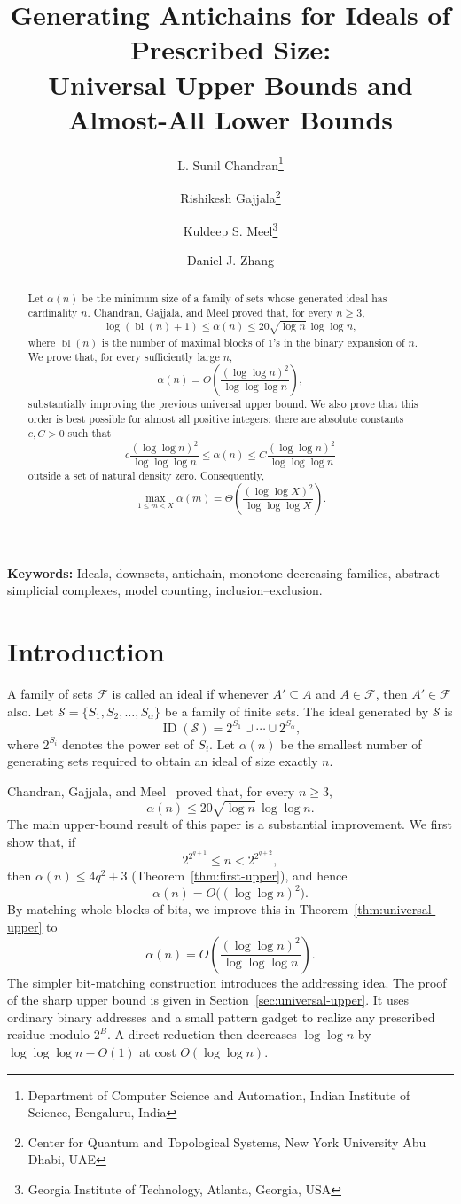 \documentclass[11pt]{article}
\title {Generating Antichains for Ideals of Prescribed Size:\\Universal Upper Bounds and Almost-All Lower Bounds}
\author{L. Sunil Chandran\thanks{Department of Computer Science and Automation, Indian Institute of Science, Bengaluru, India}
\and Rishikesh Gajjala\thanks{Center for Quantum and Topological Systems, New York University Abu Dhabi, UAE}
\and Kuldeep S. Meel\thanks{Georgia Institute of Technology, Atlanta, Georgia, USA}
\and Daniel J. Zhang\footnotemark[3]}
\date{}
\theoremstyle{definition}
\theoremstyle{remark}
\newcommand{\ID}{\operatorname{ID}}
\begin{document}
\maketitle

\begin{abstract}
Let $\alpha(n)$ be the minimum size of a family of sets whose generated ideal
has cardinality $n$.  Chandran, Gajjala, and Meel proved that, for every
$n\ge3$,
\[
  \log(\operatorname{bl}(n)+1)\le\alpha(n)
    \le20\sqrt{\log n}\,\log\log n,
\]
where $\operatorname{bl}(n)$ is the number of maximal blocks of $1$'s in the
binary expansion of $n$.  We prove that, for every sufficiently large $n$,
\[
  \alpha(n)=O\!\left(
    \frac{(\log\log n)^2}{\log\log\log n}
  \right),
\]
substantially improving the previous universal upper bound.  We also prove
that this order is best possible for almost all positive integers: there are
absolute constants $c,C>0$ such that
\[
  c\frac{(\log\log n)^2}{\log\log\log n}
  \le\alpha(n)\le
  C\frac{(\log\log n)^2}{\log\log\log n}
\]
outside a set of natural density zero.  Consequently,
\[
  \max_{1\le m<X}\alpha(m)
  =\Theta\!\left(
    \frac{(\log\log X)^2}{\log\log\log X}
  \right).
\]

\end{abstract}

\noindent\textbf{Keywords:} Ideals, downsets, antichain, monotone decreasing families, abstract simplicial complexes, model counting, inclusion--exclusion.

\section{Introduction}

A family of sets $\mathcal F$ is called an ideal if whenever $A'\subseteq A$ and $A\in\mathcal F$, then $A'\in\mathcal F$ also.
Let $\mathcal S=\{S_1,S_2,\ldots,S_\alpha\}$ be a family of finite sets. The ideal generated by $\mathcal S$ is
\[
  \ID(\mathcal S)=2^{S_1}\cup\cdots\cup2^{S_\alpha},
\]
where $2^{S_i}$ denotes the power set of $S_i$. Let $\alpha(n)$ be the smallest number of generating sets required to obtain an ideal of size exactly $n$.

Chandran, Gajjala, and Meel~\cite{ChandranGajjalaMeel26} proved that, for every $n\ge3$,
\[
    \alpha(n)\le20\sqrt{\log n}\,\log\log n.
\]
The main upper-bound result of this paper is a substantial improvement. We first show that, if
\[
  2^{2^{q+1}}\le n<2^{2^{q+2}},
\]
then $\alpha(n)\le4q^2+3$ (Theorem~\ref{thm:first-upper}), and hence
\[
  \alpha(n)=O\bigl((\log\log n)^2\bigr).
\]
By matching whole blocks of bits, we improve this in Theorem~\ref{thm:universal-upper} to
\[
  \alpha(n)=O\!\left(\frac{(\log\log n)^2}{\log\log\log n}\right).
\]
The simpler bit-matching construction introduces the addressing idea. The proof of the sharp upper bound is given in Section~\ref{sec:universal-upper}. It uses ordinary binary addresses and a small pattern gadget to realize any prescribed residue modulo $2^B$. A direct reduction then decreases $\log\log n$ by $\log\log\log n-O(1)$ at cost $O(\log\log n)$.
\end{document}
